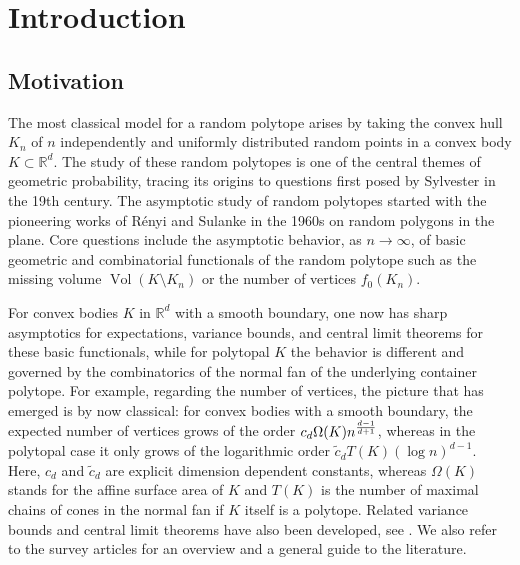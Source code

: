 \documentclass[11pt,a4paper]{article}
\numberwithin{equation}{section}
\def\RR{\mathbb{R}}
\newcommand{\vol}{\operatorname{Vol}}
\begin{document}

\section{Introduction}

\subsection{Motivation}

The most classical model for a random polytope arises by taking the convex hull $K_n$ of $n$ independently and uniformly distributed random points in a convex body $K\subset\RR^d$. The study of these random polytopes is one of the central themes of geometric probability, tracing its origins to questions first posed by Sylvester in the 19th century. The asymptotic study of random polytopes started with the pioneering works \cite{RenyiSulanke1,RenyiSulanke2} of Rényi and Sulanke in the 1960s on random polygons in the plane. Core questions include the asymptotic behavior, as $n\to\infty$, of basic geometric and combinatorial functionals of the random polytope such as the missing volume $\vol(K\setminus K_n)$ or the number of vertices $f_0(K_n)$.

For convex bodies $K$ in $\RR^d$ with a smooth boundary, one now has sharp asymptotics for expectations, variance bounds, and central limit theorems for these basic functionals, while for polytopal $K$ the behavior is different and governed by the combinatorics of the normal fan of the underlying container polytope. For example, regarding the number of vertices, the picture that has emerged is by now classical: for convex bodies with a smooth boundary, the expected number of vertices grows of the order $c_d\Omega(K)n^{d-1\over d+1}$, whereas in the polytopal case it only grows of the logarithmic order $\widetilde{c}_dT(K)(\log n)^{d-1}$. 
Here, $c_d$ and $\widetilde{c}_d$ are explicit dimension dependent constants, whereas $\Omega(K)$ stands for the affine surface area of $K$ and $T(K)$ is the number of maximal chains of cones in the normal fan if $K$ itself is a polytope. Related variance bounds and central limit theorems have also been developed, see \cite{BaranyReitzner:Variance, CalkaYukich:2014, CalkaYukich:2017, FodorPapvari:2023, FodorVigh:2018, GusakovaReitznerThaele, PardonCLT, ReitznerCLT, Reitzner:EfronStein}. We also refer to the survey articles \cite{BaranySurvey,HugSurvey,ReitznerSurvey,SchneiderSurvey, SW:2023} for an overview and a general guide to the literature.
\end{document}
